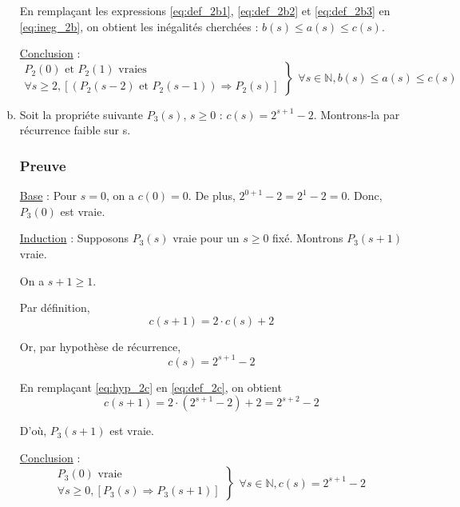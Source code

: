 \documentclass[12pt,a4paper]{article}
\begin{document}
\begin{enumerate}[a)]
En rempla\c{c}ant les expressions \eqref{eq:def_2b1}, \eqref{eq:def_2b2} et \eqref{eq:def_2b3} en \eqref{eq:ineg_2b}, on obtient les in\'egalit\'es cherch\'ees : 
$ b(s) \leq a(s) \leq c(s) $.

\medskip
\underline{Conclusion} : 
\begin{equation*}
\left .\begin{array}{l}
P_{2}(0) \text{ et } P_{2}(1) \text{ vraies } \\
\forall s \geq 2, [(P_{2}(s-2) \text{ et } P_{2}(s-1)) \Rightarrow P_{2}(s) ]
\end{array} \right \}
\left .\begin{array}{l}
\forall s \in \mathbb{N}, b(s) \leq a(s) \leq c(s)
\end{array}\right .
\end{equation*}

\item Soit la propri\'ete suivante \( P_{3}(s) \), $s \geq 0$ : $c(s) = 2^{s+1} - 2$.
Montrons-la par r\'ecurrence faible sur s.

\subsubsection*{Preuve}
\underline{Base} : Pour \( s = 0\), on a $c(0) = 0 $. De plus, $ 2^{0+1} - 2 = 2^1 - 2 = 0$. Donc, $P_{3}(0)$ est vraie.

\medskip
\underline{Induction} : Supposons \( P_{3}(s) \) vraie pour un \( s \geq 0 \) fix\'e. Montrons \( P_{3}(s+1) \) vraie.

On a $ s+1 \geq 1 $. 

Par d\'efinition, 
\begin{equation}
    c(s+1) = 2\cdot c(s) + 2 \label{eq:def_2c} 
 \end{equation}

Or, par hypoth\`ese de r\'ecurrence, 
\begin{equation}
    c(s) = 2^{s+1} - 2 \label{eq:hyp_2c}
 \end{equation}

En rempla\c{c}ant \eqref{eq:hyp_2c} en \eqref{eq:def_2c}, on obtient
\begin{equation*}
    c(s+1) = 2 \cdot (2^{s+1} - 2) + 2 = 2^{s+2} - 2
 \end{equation*}

D'o\`u, $P_{3}(s+1)$ est vraie.

\medskip
\underline{Conclusion} : 
\begin{equation*}
\left .\begin{array}{l}
P_{3}(0) \text{ vraie } \\
\forall s \geq 0, [P_{3}(s) \Rightarrow P_{3}(s+1) ]
\end{array} \right \}
\left .\begin{array}{l}
\forall s \in \mathbb{N}, c(s) = 2^{s+1} - 2
\end{array}\right .
\end{equation*}


\end{enumerate}
\end{document}
